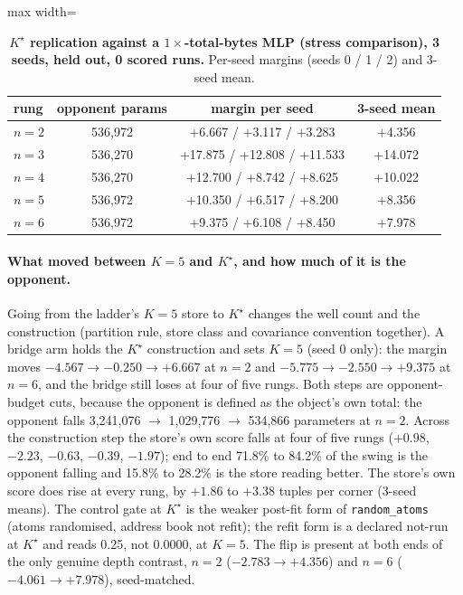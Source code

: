 \documentclass{article} %
\newcommand{\Kstar}{\ensuremath{K^{\star}}}
\begin{document}
\begin{table}[h]
\centering\small
\caption{\textbf{$\Kstar$ replication against a $1\times$-total-bytes MLP (stress comparison),
3 seeds, held out, 0 scored runs.} Per-seed margins (seeds 0 / 1 / 2) and 3-seed mean.}
\label{tab:1x}
\begin{adjustbox}{max width=\linewidth}\begin{tabular}{lccc}
\toprule
rung & opponent params & margin per seed & 3-seed mean \\
\midrule
$n=2$ & 536,972 & +6.667 / +3.117 / +3.283 & +4.356 \\
$n=3$ & 536,270 & +17.875 / +12.808 / +11.533 & +14.072 \\
$n=4$ & 536,270 & +12.700 / +8.742 / +8.625 & +10.022 \\
$n=5$ & 536,972 & +10.350 / +6.517 / +8.200 & +8.356 \\
$n=6$ & 536,972 & +9.375 / +6.108 / +8.450 & +7.978 \\
\bottomrule
\end{tabular}\end{adjustbox}
\end{table}

\paragraph{What moved between $K=5$ and $\Kstar$, and how much of it is the opponent.} Going from
the ladder's $K=5$ store to $\Kstar$ changes the well count and the construction (partition rule,
store class and covariance convention together). A bridge arm holds the $\Kstar$ construction and
sets $K=5$ (seed 0 only): the margin moves $-4.567\to-0.250\to+6.667$ at $n=2$ and
$-5.775\to-2.550\to+9.375$ at $n=6$, and the bridge still loses at four of five rungs.
Both steps are opponent-budget cuts, because the opponent is defined as the object's own total: the
opponent falls 3,241,076 $\to$ 1,029,776 $\to$ 534,866 parameters at $n=2$. Across the construction
step the store's own score falls at four of five rungs ($+0.98$, $-2.23$, $-0.63$, $-0.39$, $-1.97$);
end to end 71.8\% to 84.2\% of the swing is the opponent falling and 15.8\% to 28.2\% is the store
reading better. %
The store's own score does rise at every rung, by $+1.86$ to $+3.38$ tuples per corner (3-seed
means). %
The control gate at $\Kstar$ is the weaker post-fit form of \texttt{random\_atoms} (atoms
randomised, address book not refit); the refit form is a declared not-run at $\Kstar$ and reads
0.25, not 0.0000, at $K=5$. %
The flip is present at both ends of the only genuine depth contrast, $n=2$ ($-2.783\to+4.356$) and
$n=6$ ($-4.061\to+7.978$), seed-matched. %
\end{document}
